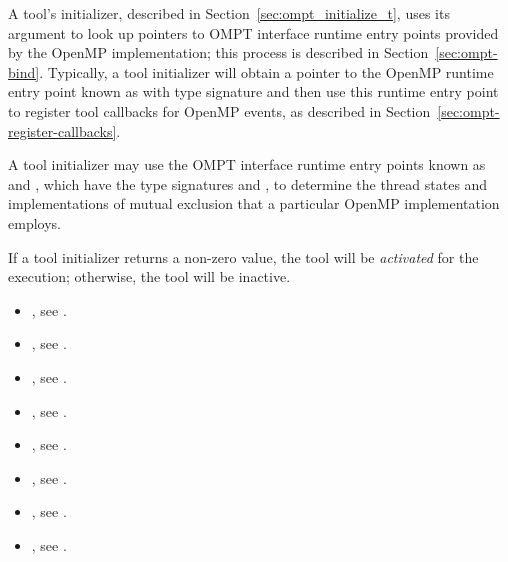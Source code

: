 A tool's initializer, described in Section~\ref{sec:ompt_initialize_t},
uses its argument  to look up pointers
to OMPT interface runtime entry points provided by the OpenMP
implementation; this process is described in Section~\ref{sec:ompt-bind}.
Typically, a tool initializer will
obtain a pointer to the OpenMP runtime entry point known as
 with type signature
 and then use this runtime entry point to
register tool callbacks for OpenMP events, as described in
Section~\ref{sec:ompt-register-callbacks}.

A tool initializer may use the OMPT interface runtime
entry points known as  and
, which have the type signatures
 and
, to determine the thread
states and implementations of mutual exclusion that a particular OpenMP
implementation employs.


If a tool initializer returns a non-zero value, the tool will be
\emph{activated} for the execution; otherwise, the tool will be
inactive.

\crossreferences
\begin{itemize}
\item {}, see
  .
\item {}, see .
\item {}, see .
\item {}, see .
\item {}, see   .
\item {}, see .
\item {}, see .
\item {}, see .
\end{itemize}


\label{sec:ompt-bind}

